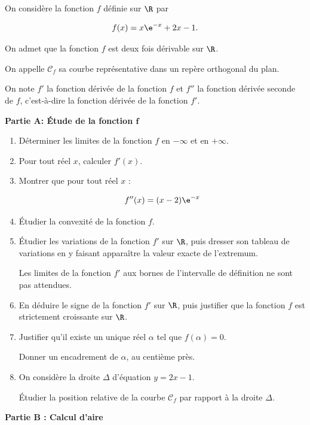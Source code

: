 \medskip

On considère la fonction $f$ définie sur $\R$ par 

\[f(x)=x \e^{-x}+2 x-1.\]

On admet que la fonction $f$ est deux fois dérivable sur $\R$.

On appelle $\mathcal{C}_{f}$ sa courbe représentative dans un repère orthogonal du plan.

	On note $f'$ la fonction dérivée de la fonction $f$ et $f''$ la fonction dérivée seconde de $f$, c'est-à-dire la fonction dérivée de la fonction $f'$.

\bigskip

\textbf{Partie A: Étude de la fonction $\boldsymbol{f}$}

\medskip

\begin{enumerate}
\item Déterminer les limites de la fonction $f$ en $-\infty$ et en $+\infty$.
\item Pour tout réel $x$, calculer $f'(x)$.
\item Montrer que pour tout réel $x$ :

\[f''(x)= (x-2) \e^{-x}\]

\item Étudier la convexité de la fonction $f$.

\item Étudier les variations de la fonction $f'$ sur $\R$, puis dresser son tableau de variations en y faisant apparaître la valeur exacte de l'extremum.

Les limites de la fonction $f'$ aux bornes de l'intervalle de définition ne sont pas attendues.

\item En déduire le signe de la fonction $f'$ sur $\R$, puis justifier que la fonction $f$ est strictement croissante sur $\R$.
\item Justifier qu'il existe un unique réel $\alpha$ tel que $f(\alpha)=0$.

Donner un encadrement de $\alpha$, au centième près.
\item On considère la droite $\Delta$ d'équation $y=2 x-1$.

Étudier la position relative de la courbe $\mathcal{C}_{f}$ par rapport à la droite $\Delta$.
\end{enumerate}

\bigskip

\textbf{Partie B : Calcul d'aire}

